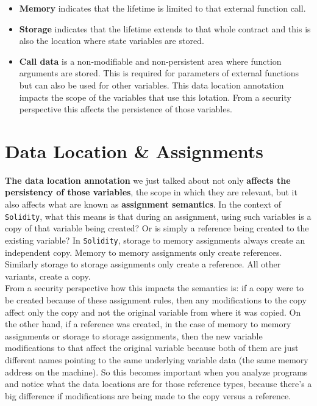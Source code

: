 \begin{itemize}

\item\textbf{Memory} indicates that the lifetime is limited to that external function call.\\
\item\textbf{Storage} indicates that the lifetime extends to that whole contract and this is also the location where state variables are stored.\\
\item\textbf{Call data} is a non-modifiable and non-persistent area where function arguments are stored. This is required for parameters of external functions but can also be used for other variables. This data location annotation impacts the scope of the variables that use this lotation. From a security perspective this affects the persistence of those variables.
\end{itemize}


\section{Data Location \& Assignments}
\textbf{The data location annotation} we just talked about not only \textbf{affects the persistency of those variables}, the scope in which they are relevant, but it also affects what are known as \textbf{assignment semantics}. In the context of \texttt{Solidity}, what this means is that during an assignment, using such variables is a copy of that variable being created? Or is simply a reference being created to the existing variable? In \texttt{Solidity}, storage to memory assignments always create an independent copy. Memory to memory assignments only create references. Similarly storage to storage assignments only create a reference. All other variants, create a copy.\\ 

From a security perspective how this impacts the semantics is: if a copy were to be created because of these assignment rules, then any modifications to the copy affect only the copy and not the original variable from where it was copied. On the other hand, if a reference was created, in the case of memory to memory assignments or storage to storage assignments, then the new variable modifications to that affect the original variable because both of them are just different names pointing to the same underlying variable data (the same memory address on the machine). So this becomes important when you analyze programs and notice what the data locations are for those reference types, because there's a big difference if modifications are being made to the copy versus a reference.

